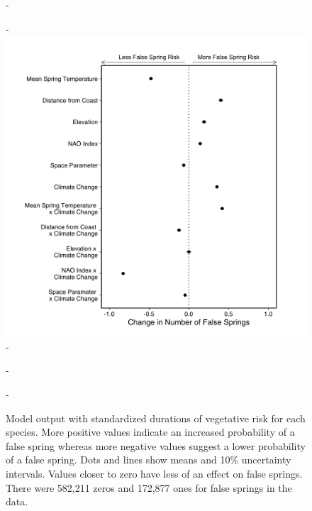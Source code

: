 \documentclass{article}\usepackage[]{graphicx}\usepackage[]{color}
\begin{document}
  
{\begin{figure} [H]
  -\begin{center}
  -\includegraphics[width=12cm]{..//analyses/figures/model_output_90.png}
  -\caption{Model output with standardized durations of vegetative risk for each species. More positive values indicate an increased probability of a false spring whereas more negative values suggest a lower probability of a false spring. Dots and lines show means and 10\% uncertainty intervals. Values closer to zero have less of an effect on false springs. There were 582,211 zeros and 172,877 ones for false springs in the data.}\label{fig:maineffects}
  -\end{center}
  -\end{figure}}


  
\end{document}
